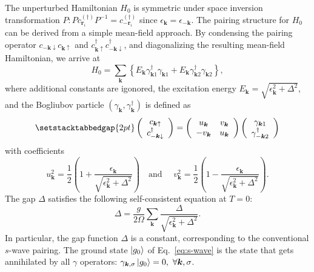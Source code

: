 \documentclass[11pt]{article}
\begin{document}
The unperturbed Hamiltonian $H_0$ is symmetric under space inversion transformation
$P: P c^{(\dagger)}_{\bm r_i} P^{-1} = c^{(\dagger)}_{-\bm r_i}$ since $\epsilon_{\bm k} = \epsilon_{-\bm k}$.
The pairing structure for $H_0$ can be derived from a simple mean-field approach.
By condensing the pairing operator $c_{\bm{-k}\downarrow} c_{\bm{k} \uparrow}$ and
$c^\dagger_{\bm{k}\uparrow} c^\dagger_{\bm{-k} \downarrow}$, and diagonalizing
the resulting mean-field Hamiltonian, we arrive at
\begin{equation}\label{eq:s-wave}
    H_0 = \sum_{\bm{k}}\left\{E_{\bm{k}}{\gamma}_{\bm{k} 1}^{\dagger}
    {\gamma}_{\bm{k} 1}+E_{\bm{k}} {\gamma}_{\bm{k} 2}^{\dagger} {\gamma}_{\bm{k} 2}\right\},
\end{equation}
where additional constants are igonored, the excitation energy
$E_{\bm {k}} = \sqrt{\epsilon_{\bm {k}}^2 + \Delta^2}$,
and the Bogliubov particle $(\gamma_{\bm k}, \gamma^\dagger_{\bm k})$ is defined as
\begin{equation}
    \setstacktabbedgap{2pt}
    \left(\begin{array}{c}
    {c}_{\boldsymbol{k} \uparrow} \\
    {c}_{-\boldsymbol{k} \downarrow}^{\dagger}
    \end{array}\right)=
    \left(\begin{array}{cc}
    u_{\boldsymbol{k}} & v_{\boldsymbol{k}} \\
    -v_{\boldsymbol{k}} & u_{\boldsymbol{k}}
    \end{array}\right)
    \left(\begin{array}{c}
    {\gamma}_{\boldsymbol{k} 1} \\
    {\gamma}_{-\boldsymbol{k} 2}^{\dagger}
    \end{array}\right)
\end{equation}
with coefficients
\begin{equation}
    u_{\bm k}^2=\frac{1}{2}\left(1+\frac{\epsilon_{\bm k}}{\sqrt{\epsilon_{\bm k}^2 + \Delta^2}} \right) \quad \text {
    and } \quad v_{\bm k}^2=\frac{1}{2}\left(1-\frac{\epsilon_{\bm k}}{\sqrt{\epsilon_{\bm k}^2 + \Delta^2}}\right).
\end{equation}
The gap $\Delta$ satisfies the following self-consistent equation at $T=0$:
\begin{equation}
    \Delta = \frac{g}{2 \Omega} \sum_{\bm{k}} \frac{\Delta}{\sqrt{\epsilon_{\bm k}^2 + \Delta^2}}.
\end{equation}
In particular, the gap function $\Delta$ is a constant, corresponding to the conventional
$s$-wave pairing.
The ground state $\left \rvert g_0 \right \rangle$ of Eq.~\eqref{eq:s-wave} is the state that gets annihilated
by all $\gamma$ operators:
$\gamma_{\bm k, \sigma}\left \rvert g_0 \right \rangle = 0,\ \forall \bm{k},\sigma$.
\end{document}
